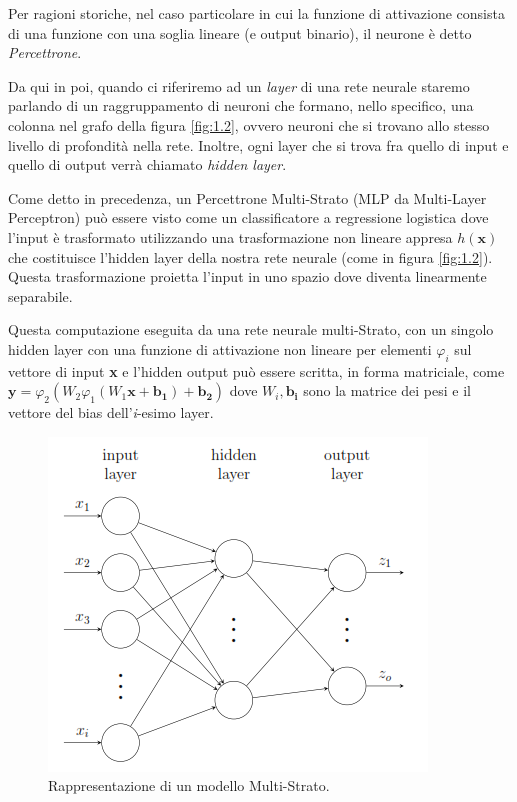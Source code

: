Per ragioni storiche, nel caso particolare in cui la funzione di attivazione consista di una funzione con una soglia lineare (e output binario), il neurone è detto \textit{Percettrone}.

Da qui in poi, quando ci riferiremo ad un \textit{layer} di una rete neurale staremo parlando di un raggruppamento di neuroni che formano, nello specifico, una colonna nel grafo della figura \ref{fig:1.2}, ovvero neuroni che si trovano allo stesso livello di profondità nella rete. Inoltre, ogni layer che si trova fra quello di input e quello di output verrà chiamato \textit{hidden layer}.

Come detto in precedenza, un Percettrone Multi-Strato (MLP da Multi-Layer Perceptron) può essere visto come un classificatore a regressione logistica dove l'input è trasformato utilizzando una trasformazione non lineare appresa $h(\textbf{x})$ che costituisce l'hidden layer della nostra rete neurale (come in figura \ref{fig:1.2}). Questa trasformazione proietta l'input in uno spazio dove diventa linearmente separabile.

Questa computazione eseguita da una rete neurale multi-Strato, con un singolo hidden layer con una funzione di attivazione non lineare per elementi $\varphi_i$ sul vettore di input \textbf{x} e l'hidden output può essere scritta, in forma matriciale, come $\boldsymbol{y} = \varphi_2(W_2\varphi_1(W_1\boldsymbol{x} + \boldsymbol{b_1}) + \boldsymbol{b_2})$ dove $W_i, \boldsymbol{b_i}$ sono la matrice dei pesi e il vettore del bias dell'\textit{i}-esimo layer.

\begin{figure}[h]
	\centering
	\includegraphics{img/MLN.png}
	\caption{Rappresentazione di un modello Multi-Strato.}
	\label{fig:1.3}
\end{figure}

